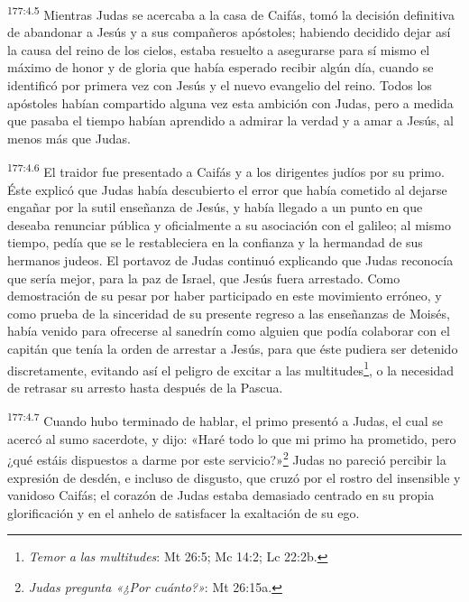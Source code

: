 \par 
\textsuperscript{177:4.5} Mientras Judas se acercaba a la casa de Caifás, tomó la decisión definitiva de abandonar a Jesús y a sus compañeros apóstoles; habiendo decidido dejar así la causa del reino de los cielos, estaba resuelto a asegurarse para sí mismo el máximo de honor y de gloria que había esperado recibir algún día, cuando se identificó por primera vez con Jesús y el nuevo evangelio del reino. Todos los apóstoles habían compartido alguna vez esta ambición con Judas, pero a medida que pasaba el tiempo habían aprendido a admirar la verdad y a amar a Jesús, al menos más que Judas.

\par 
\textsuperscript{177:4.6} El traidor fue presentado a Caifás y a los dirigentes judíos por su primo. Éste explicó que Judas había descubierto el error que había cometido al dejarse engañar por la sutil enseñanza de Jesús, y había llegado a un punto en que deseaba renunciar pública y oficialmente a su asociación con el galileo; al mismo tiempo, pedía que se le restableciera en la confianza y la hermandad de sus hermanos judeos. El portavoz de Judas continuó explicando que Judas reconocía que sería mejor, para la paz de Israel, que Jesús fuera arrestado. Como demostración de su pesar por haber participado en este movimiento erróneo, y como prueba de la sinceridad de su presente regreso a las enseñanzas de Moisés, había venido para ofrecerse al sanedrín como alguien que podía colaborar con el capitán que tenía la orden de arrestar a Jesús, para que éste pudiera ser detenido discretamente, evitando así el peligro de excitar a las multitudes\footnote{\textit{Temor a las multitudes}: Mt 26:5; Mc 14:2; Lc 22:2b.}, o la necesidad de retrasar su arresto hasta después de la Pascua.

\par 
\textsuperscript{177:4.7} Cuando hubo terminado de hablar, el primo presentó a Judas, el cual se acercó al sumo sacerdote, y dijo: «Haré todo lo que mi primo ha prometido, pero ¿qué estáis dispuestos a darme por este servicio?»\footnote{\textit{Judas pregunta «¿Por cuánto?»}: Mt 26:15a.} Judas no pareció percibir la expresión de desdén, e incluso de disgusto, que cruzó por el rostro del insensible y vanidoso Caifás; el corazón de Judas estaba demasiado centrado en su propia glorificación y en el anhelo de satisfacer la exaltación de su ego.

